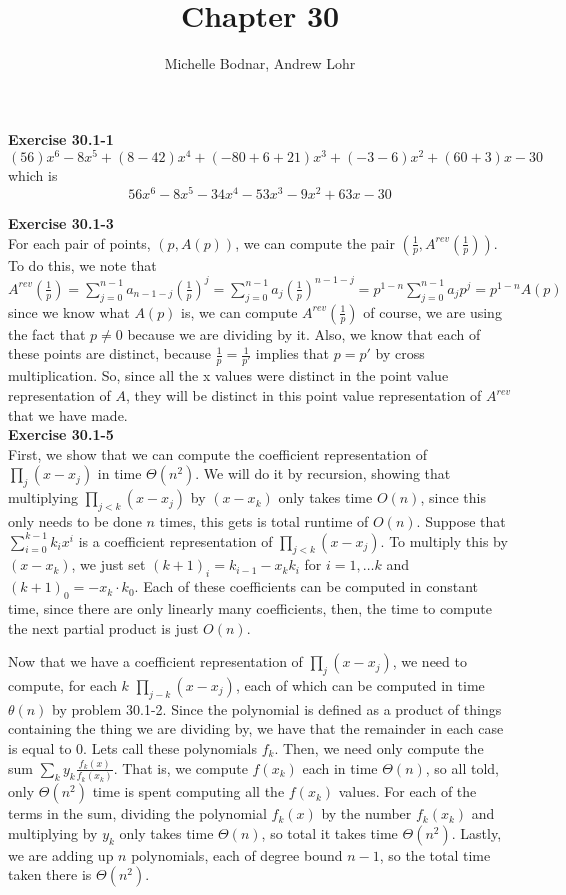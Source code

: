 \documentclass{article}
\title{Chapter 30}
\author{Michelle Bodnar, Andrew Lohr}
\begin{document}
\maketitle
\noindent\textbf{Exercise 30.1-1}\\
\[
(56)x^6 -8x^5 + (8-42)x^4 + (-80 + 6+21)x^3 + (-3-6)x^2 + (60+3)x -30
\]
which is 
\[
56x^6 - 8 x^5 -34x^4 - 53 x^3-9x^2+63x-30
\]



\noindent\textbf{Exercise 30.1-3}\\
For each pair of points, $(p,A(p))$, we can compute the pair $(\frac{1}{p}, A^{rev}(\frac{1}{p}))$. To do this, we note that $A^{rev}(\frac{1}{p}) = \sum_{j=0}^{n-1} a_{n-1-j} \left(\frac{1}{p}\right)^j = \sum_{j=0}^{n-1} a_{j} \left( \frac{1}{p}\right)^{n-1-j} = p^{1-n} \sum_{j=0}^{n-1} a_j p^j = p^{1-n} A(p)$ since we know what $A(p)$ is, we can compute $A^{rev}(\frac{1}{p})$ of course, we are using the fact that $p\neq0$ because we are dividing by it. Also, we know that each of these points are distinct, because $\frac{1}{p} = \frac{1}{p'}$  implies that $p=p'$ by cross multiplication. So, since all the x values were distinct in the point value representation of $A$, they will be distinct in this point value representation of $A^{rev}$ that we have made.\\



\noindent\textbf{Exercise 30.1-5}\\
First, we show that we can compute the coefficient representation of $\prod_{j} (x-x_j)$ in time $\Theta(n^2)$. We will do it by recursion, showing that multiplying $\prod_{j<k} (x-x_j)$ by $(x-x_k)$ only takes time $O(n)$, since this only needs to be done $n$ times, this gets is total runtime of $O(n)$. Suppose that $\sum_{i=0}^{k-1} {k_i}x^i$ is a coefficient representation of $\prod_{j<k} (x-x_j)$. To multiply this by $(x-x_k)$, we just set $(k+1)_i = k_{i-1} - x_k k_i$ for $i= 1,\ldots k$ and $(k+1)_0 = -x_k \cdot k_0$. Each of these coefficients can be computed in constant time, since there are only linearly many coefficients, then, the time to compute the next partial product is just $O(n)$.

Now that we have a coefficient representation of $\prod_j (x-x_j)$, we need to compute, for each $k$ $\prod_{j-k} (x-x_j)$, each of which can be computed in time $\theta(n)$ by problem 30.1-2. Since the polynomial is defined as a product of things containing the thing we are dividing by, we have that the remainder in each case is equal to 0. Lets call these polynomials $f_k$. Then, we need only compute the sum $\sum_{k} y_k \frac{f_k(x)}{f_k(x_k)}$. That is, we compute $f(x_k)$ each in time $\Theta(n)$, so all told, only $\Theta(n^2)$ time is spent computing all the $f(x_k)$ values. For each of the terms in the sum, dividing the polynomial $f_k(x)$ by the number $f_k(x_k)$ and multiplying by $y_k$ only takes time $\Theta(n)$, so total it takes time $\Theta(n^2)$. Lastly, we are adding up $n$ polynomials, each of degree bound $n-1$, so the total time taken there is $\Theta(n^2)$.\\
\end{document}
